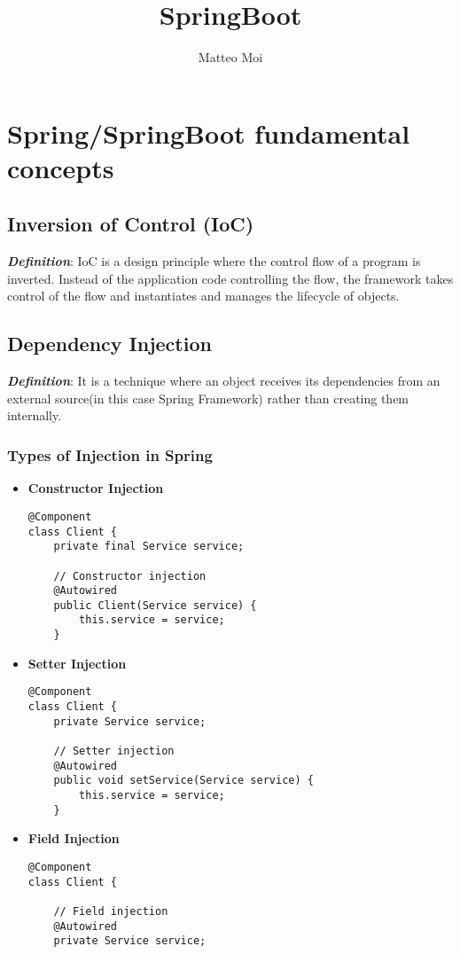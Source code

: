 \documentclass[a4paper, 12pt]{article}
\begin{document}
    \title{SpringBoot}
    \author{Matteo Moi}
    \date{}
    \maketitle

    \tableofcontents
    \newpage


    \section{Spring/SpringBoot fundamental concepts}

    \subsection{Inversion of Control (IoC)}
    \textit{\textbf{Definition}}: IoC is a design principle where the control flow of a program is inverted. Instead of the application code controlling the flow, the framework takes control of the flow and instantiates and manages the lifecycle of objects.

    \subsection{Dependency Injection}
    \textit{\textbf{Definition}}: It is a technique where an object receives its dependencies from an external source(in this case Spring Framework) rather than creating them internally.

    \subsubsection{Types of Injection in Spring}
    \begin{itemize}
        \item \textbf{Constructor Injection}
        \begin{lstlisting}
@Component
class Client {
    private final Service service;

    // Constructor injection
    @Autowired
    public Client(Service service) {
        this.service = service;
    }
        \end{lstlisting}
        \item \textbf{Setter Injection}
        \begin{lstlisting}
@Component
class Client {
    private Service service;

    // Setter injection
    @Autowired
    public void setService(Service service) {
        this.service = service;
    }
        \end{lstlisting}
        \item \textbf{Field Injection}
        \begin{lstlisting}
@Component
class Client {

    // Field injection
    @Autowired
    private Service service;
        \end{lstlisting}

    \end{itemize}
\end{document}
